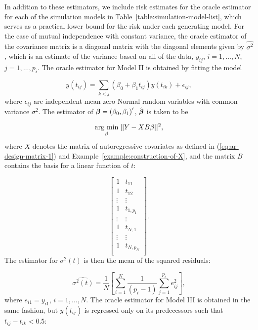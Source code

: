 \bigskip

In addition to these estimators, we include risk estimates for the oracle estimator for each of the simulation models in Table~\ref{table:simulation-model-list}, which serves as a practical lower bound for the risk under each generating model. For the case of mutual independence with constant variance, the oracle estimator of the covariance matrix is a diagonal matrix with the diagonal elements given by $\hat{\sigma^2}$, which is an estimate of the variance based on all of the data, $y_{ij}$, $i = 1,\dots, N$, $j = 1,\dots, p_i$. The oracle estimator for Model II is obtained by fitting the model

\begin{equation} \label{eq:model-2-oracle-model}
y\left(t_{ij}\right) = \sum_{k < j} \left(\beta_0 + \beta_1 t_{ij}\right) y\left( t_{ik} \right) + \epsilon_{ij},
\end{equation}
\noindent 
where $\epsilon_{ij}$ are independent mean zero Normal random variables with common variance $\sigma^2$. The estimator of $\mbox{\boldmath $\beta$} = \left(\beta_0, \beta_1\right)'$, $\hat{\mbox{\boldmath $\beta$}}$ is taken to be 

\begin{equation}\label{eq:model-2-oracle-estimator}
\underset{\beta}{\operatorname{arg}\,\operatorname{min}}\; \vert \vert Y - X B \beta \vert \vert^2, 
\end{equation}
\noindent
where $X$ denotes the matrix of autoregressive covariates as defined in (\ref{eq:ar-design-matrix-1}) and Example~\ref{example:construction-of-X}, and the matrix $B$ contains the basis for a linear function of $t$:

\[
\begin{bmatrix}
1 & t_{11} \\
1 & t_{12} \\
\vdots & \vdots \\
1 & t_{1,p_1} \\
\vdots & \vdots \\
1 & t_{N,1} \\
\vdots & \vdots \\
1 & t_{N,p_N} \\
\end{bmatrix}.
\]
\noindent
The estimator for $\sigma^2\left(t\right)$ is then the mean of the squared residuals:

\[
\hat{\sigma^2\left( t \right)} = \frac{1}{N}\left[\sum_{i = 1}^N\frac{1}{\left(p_i - 1\right)} \sum_{j = 1}^{p_i} e_{ij}^2\right],
\]
\noindent
where $e_{i1} = y_{i1}$, $i = 1,\dots, N$. The oracle estimator for Model III is obtained in the same fashion, but $y\left(t_{ij}\right)$ is regressed only on its predecessors such that $t_{ij} - t_{ik} < 0.5$:

